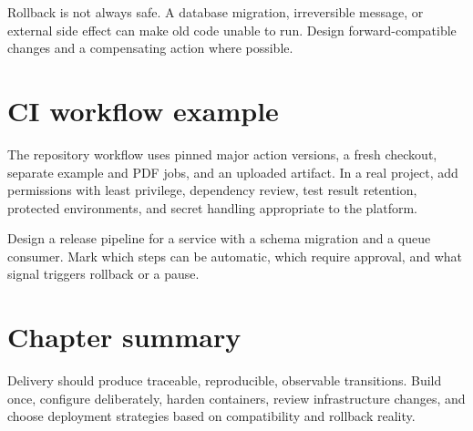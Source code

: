 Rollback is not always safe. A database migration, irreversible message, or
external side effect can make old code unable to run. Design forward-compatible
changes and a compensating action where possible.

\section{CI workflow example}
The repository workflow uses pinned major action versions, a fresh checkout,
separate example and PDF jobs, and an uploaded artifact. In a real project, add
permissions with least privilege, dependency review, test result retention,
protected environments, and secret handling appropriate to the platform.

\begin{exercise}
Design a release pipeline for a service with a schema migration and a queue
consumer. Mark which steps can be automatic, which require approval, and what
signal triggers rollback or a pause.
\end{exercise}

\section{Chapter summary}
Delivery should produce traceable, reproducible, observable transitions. Build
once, configure deliberately, harden containers, review infrastructure changes,
and choose deployment strategies based on compatibility and rollback reality.
